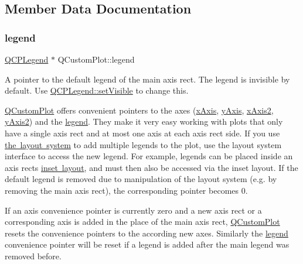 \subsection{Member Data Documentation}
\mbox{\label{class_q_custom_plot_a4eadcd237dc6a09938b68b16877fa6af}} 
\subsubsection{\texorpdfstring{legend}{legend}}
{\footnotesize\ttfamily \mbox{\hyperlink{class_q_c_p_legend}{Q\+C\+P\+Legend}} $\ast$ Q\+Custom\+Plot\+::legend}

A pointer to the default legend of the main axis rect. The legend is invisible by default. Use \mbox{\hyperlink{class_q_c_p_layerable_a3bed99ddc396b48ce3ebfdc0418744f8}{Q\+C\+P\+Legend\+::set\+Visible}} to change this.

\mbox{\hyperlink{class_q_custom_plot}{Q\+Custom\+Plot}} offers convenient pointers to the axes (\mbox{\hyperlink{class_q_custom_plot_a9a79cd0158a4c7f30cbc702f0fd800e4}{x\+Axis}}, \mbox{\hyperlink{class_q_custom_plot_af6fea5679725b152c14facd920b19367}{y\+Axis}}, \mbox{\hyperlink{class_q_custom_plot_ada41599f22cad901c030f3dcbdd82fd9}{x\+Axis2}}, \mbox{\hyperlink{class_q_custom_plot_af13fdc5bce7d0fabd640f13ba805c0b7}{y\+Axis2}}) and the \mbox{\hyperlink{class_q_custom_plot_a4eadcd237dc6a09938b68b16877fa6af}{legend}}. They make it very easy working with plots that only have a single axis rect and at most one axis at each axis rect side. If you use \mbox{\hyperlink{}{the layout system}} to add multiple legends to the plot, use the layout system interface to access the new legend. For example, legends can be placed inside an axis rect\textquotesingle{}s \mbox{\hyperlink{class_q_c_p_axis_rect_a949f803466619924c7018df4b511ae10}{inset layout}}, and must then also be accessed via the inset layout. If the default legend is removed due to manipulation of the layout system (e.\+g. by removing the main axis rect), the corresponding pointer becomes 0.

If an axis convenience pointer is currently zero and a new axis rect or a corresponding axis is added in the place of the main axis rect, \mbox{\hyperlink{class_q_custom_plot}{Q\+Custom\+Plot}} resets the convenience pointers to the according new axes. Similarly the \mbox{\hyperlink{class_q_custom_plot_a4eadcd237dc6a09938b68b16877fa6af}{legend}} convenience pointer will be reset if a legend is added after the main legend was removed before. \mbox{\label{class_q_custom_plot_a9a79cd0158a4c7f30cbc702f0fd800e4}} 
